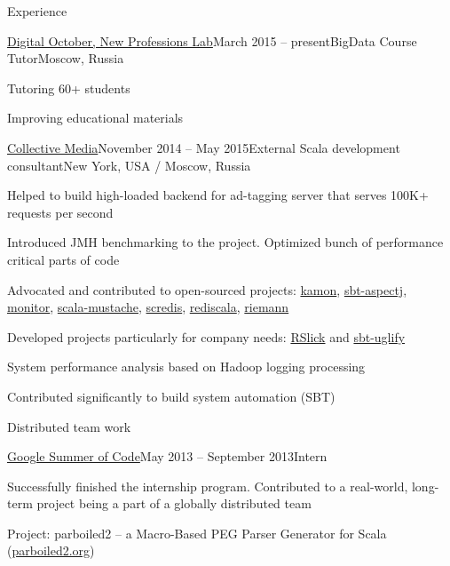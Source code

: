 \documentclass{resume} %
\begin{document}
\begin{rSection}{Experience}

\begin{rSubsection}{\href{http://newprolab.com/bigdata/eng/}{Digital October, New Professions Lab}}{March 2015 -- present}{BigData Course Tutor}{Moscow, Russia}
\item Tutoring 60+ students
\item Improving educational materials
\end{rSubsection}


\begin{rSubsection}{\href{http://collective.com}{Collective Media}}{November 2014 -- May 2015}{External Scala development consultant}{New York, USA / Moscow, Russia}
\item Helped to build high-loaded backend for ad-tagging server that serves 100K+ requests per second
\item Introduced JMH benchmarking to the project. Optimized bunch of performance critical parts of code
\item Advocated and contributed to open-sourced projects: \href{https://github.com/kamon-io/Kamon}{kamon}, \href{https://github.com/sbt/sbt-aspectj}{sbt-aspectj}, \href{https://github.com/eigengo/monitor}{monitor}, \href{https://github.com/vspy/scala-mustache}{scala-mustache}, \href{https://github.com/Livestream/scredis}{scredis}, \href{https://github.com/etaty/rediscala}{rediscala}, \href{https://github.com/aphyr/riemann}{riemann}
\item Developed projects particularly for company needs: \href{http://github.com/alexander-myltsev/RSlick}{RSlick} and \href{http://github.com/alexander-myltsev/sbt-uglify}{sbt-uglify}
\item System performance analysis based on Hadoop logging processing
\item Contributed significantly to build system automation (SBT)
\item Distributed team work
\end{rSubsection}


\begin{rSubsection}{\href{https://www.google-melange.com/gsoc/project/details/google/gsoc2013/alexander__myltsev/5818821692620800}{Google Summer of Code}}{May 2013 -- September 2013}{Intern}{}
\item Successfully finished the internship program. Contributed to a real-world, long-term project being a part of a globally distributed team
\item Project: parboiled2 -- a Macro-Based PEG Parser Generator for Scala (\href{http://parboiled2.org}{parboiled2.org})
\end{rSubsection}


\end{rSection}
\end{document}
